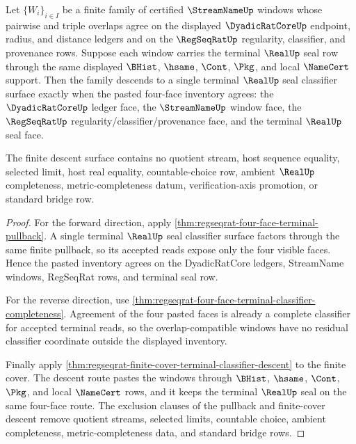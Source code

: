 \begin{theorem}
\label{thm:regseqrat-four-face-terminal-finite-descent}
Let $\{W_i\}_{i \in I}$ be a finite family of certified $\StreamNameUp$
windows whose pairwise and triple overlaps agree on the displayed
$\DyadicRatCoreUp$ endpoint, radius, and distance ledgers and on the
$\RegSeqRatUp$ regularity, classifier, and provenance rows. Suppose each
window carries the terminal $\RealUp$ seal row through the same displayed
$\BHist$, $\hsame$, $\Cont$, $\Pkg$, and local $\NameCert$ support. Then the
family descends to a single terminal $\RealUp$ seal classifier surface exactly
when the pasted four-face inventory agrees: the $\DyadicRatCoreUp$ ledger
face, the $\StreamNameUp$ window face, the $\RegSeqRatUp$
regularity/classifier/provenance face, and the terminal $\RealUp$ seal face.

The finite descent surface contains no quotient stream, host sequence
equality, selected limit, host real equality, countable-choice row, ambient
$\RealUp$ completeness, metric-completeness datum, verification-axis
promotion, or standard bridge row.
\end{theorem}
\begin{proof}
For the forward direction, apply
\autoref{thm:regseqrat-four-face-terminal-pullback}. A single terminal
$\RealUp$ seal classifier surface factors through the same finite pullback,
so its accepted reads expose only the four visible faces. Hence the pasted
inventory agrees on the DyadicRatCore ledgers, StreamName windows, RegSeqRat
rows, and terminal seal row.

For the reverse direction, use
\autoref{thm:regseqrat-four-face-terminal-classifier-completeness}. Agreement
of the four pasted faces is already a complete classifier for accepted
terminal reads, so the overlap-compatible windows have no residual classifier
coordinate outside the displayed inventory.

Finally apply
\autoref{thm:regseqrat-finite-cover-terminal-classifier-descent} to the
finite cover. The descent route pastes the windows through $\BHist$,
$\hsame$, $\Cont$, $\Pkg$, and local $\NameCert$ rows, and it keeps the
terminal $\RealUp$ seal on the same four-face route. The exclusion clauses of
the pullback and finite-cover descent remove quotient streams, selected
limits, countable choice, ambient completeness, metric-completeness data, and
standard bridge rows.
\end{proof}

